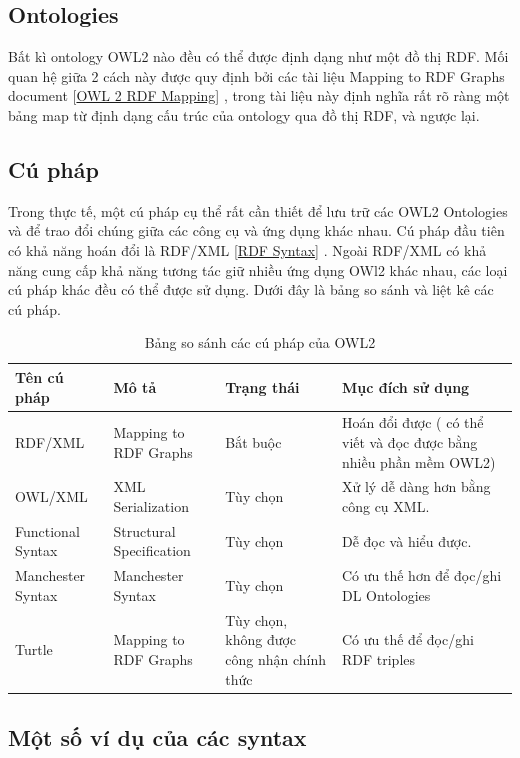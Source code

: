 \subsection{Ontologies}
Bất kì ontology OWL2 nào đều có thể được định dạng như một đồ thị RDF. Mối quan hệ giữa 2 cách này được quy định bởi các tài liệu Mapping to RDF Graphs document [\href{http://www.w3.org/TR/owl2-overview/#ref-owl-2-rdf-mapping}{OWL 2 RDF Mapping}] \cite{mapping_rdf_graph}, trong tài liệu này định nghĩa rất rõ ràng một bảng map từ định dạng cấu trúc của ontology qua đồ thị RDF, và ngược lại. 
\subsection{Cú pháp}
Trong thực tế, một cú pháp cụ thể rất cần thiết để lưu trữ các OWL2 Ontologies và để trao đổi chúng giữa các công cụ và ứng dụng khác nhau. Cú pháp đầu tiên có khả năng hoán đổi là RDF/XML [\href{http://www.w3.org/TR/owl2-overview/#ref-rdf-syntax}{RDF Syntax}] \cite{rdfxml}. Ngoài RDF/XML có khả năng cung cấp khả năng tương tác giữ nhiều ứng dụng OWl2 khác nhau, các loại cú pháp khác đều có thể được sử dụng. Dưới đây là bảng so sánh và liệt kê các cú pháp.
\begin{table}[H]
\begin{tabular}{ |p{3cm}|p{4cm}|p{2cm}|p{4cm}|}
\hline
Tên cú pháp & Mô tả & Trạng thái & Mục đích sử dụng\\
\hline
RDF/XML & Mapping to RDF Graphs \cite{mapping_rdf_graph} \cite{rdfxml} & Bắt buộc & Hoán đổi được ( có thể viết và đọc được bằng nhiều phần mềm OWL2)
\\
\hline
OWL/XML & XML Serialization \cite{owlxml} & Tùy chọn & Xử lý dễ dàng hơn bằng công cụ XML.
\\
\hline
Functional Syntax & Structural Specification \cite{func_syntax} & Tùy chọn & Dễ đọc và hiểu được.
\\
\hline
Manchester Syntax & Manchester Syntax \cite{man_syntax} & Tùy chọn & Có ưu thế hơn để đọc/ghi DL Ontologies
\\
\hline
Turtle & Mapping to RDF Graphs \cite{mapping_rdf_graph} & Tùy chọn, không được công nhận chính thức & Có ưu thế để đọc/ghi RDF triples
\\
\hline
\end{tabular}
\caption{Bảng so sánh các cú pháp của OWL2\label{overflow}}
\end{table}
\subsection{Một số ví dụ của các syntax}

